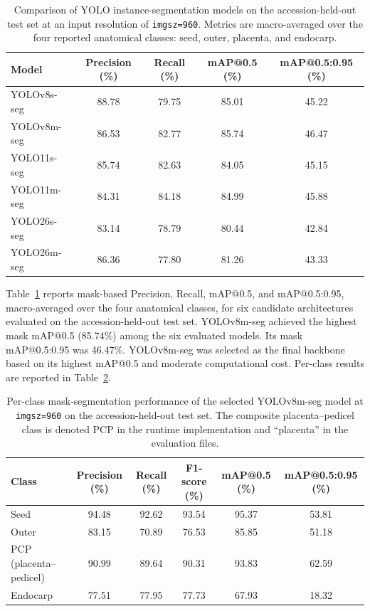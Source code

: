 \documentclass[final,5p,times,twocolumn]{elsarticle}
\begin{document}
\begin{table}[htbp]
\centering
\caption{Comparison of YOLO instance-segmentation models on the accession-held-out test set at an input resolution of \texttt{imgsz=960}. Metrics are macro-averaged over the four reported anatomical classes: seed, outer, placenta, and endocarp.}
\label{tab:model_comparison}
\begin{tabular}{lcccc}
\hline
Model & Precision (\%) & Recall (\%) & mAP@0.5 (\%) & mAP@0.5:0.95 (\%) \\
\hline
YOLOv8s-seg & 88.78 & 79.75 & 85.01 & 45.22 \\
YOLOv8m-seg & 86.53 & 82.77 & 85.74 & 46.47 \\
YOLO11s-seg & 85.74 & 82.63 & 84.05 & 45.15 \\
YOLO11m-seg & 84.31 & 84.18 & 84.99 & 45.88 \\
YOLO26s-seg & 83.14 & 78.79 & 80.44 & 42.84 \\
YOLO26m-seg & 86.36 & 77.80 & 81.26 & 43.33 \\
\hline
\end{tabular}
\end{table}

Table~\ref{tab:model_comparison} reports mask-based Precision, Recall, mAP@0.5, and mAP@0.5:0.95, macro-averaged over the four anatomical classes, for six candidate architectures evaluated on the accession-held-out test set. YOLOv8m-seg achieved the highest mask mAP@0.5 (85.74\%) among the six evaluated models. Its mask mAP@0.5:0.95 was 46.47\%. YOLOv8m-seg was selected as the final backbone based on its highest mAP@0.5 and moderate computational cost. Per-class results are reported in Table~\ref{tab:per_class}.

\begin{table}[htbp]
\centering
\caption{Per-class mask-segmentation performance of the selected YOLOv8m-seg model at \texttt{imgsz=960} on the accession-held-out test set. The composite placenta--pedicel class is denoted PCP in the runtime implementation and ``placenta'' in the evaluation files.}
\label{tab:per_class}
\begin{tabular}{lccccc}
\hline
Class & Precision (\%) & Recall (\%) & F1-score (\%) & mAP@0.5 (\%) & mAP@0.5:0.95 (\%) \\
\hline
Seed & 94.48 & 92.62 & 93.54 & 95.37 & 53.81 \\
Outer & 83.15 & 70.89 & 76.53 & 85.85 & 51.18 \\
PCP (placenta--pedicel) & 90.99 & 89.64 & 90.31 & 93.83 & 62.59 \\
Endocarp & 77.51 & 77.95 & 77.73 & 67.93 & 18.32 \\
\hline
\end{tabular}
\end{table}
\end{document}
